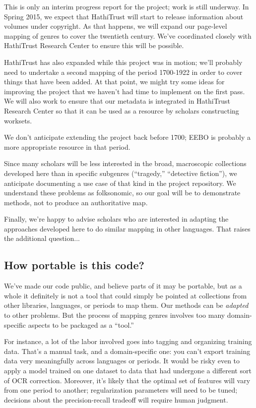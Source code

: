 \documentclass[paper=a4, fontsize=12pt]{scrartcl}
\numberwithin{equation}{section}		%
\numberwithin{figure}{section}			%
\numberwithin{table}{section}				%
\begin{document}
This is only an interim progress report for the project; work is still underway. In Spring 2015, we expect that HathiTrust will start to release information about volumes under copyright. As that happens, we will expand our page-level mapping of genres to cover the twentieth century. We've coordinated closely with HathiTrust Research Center to ensure this will be possible.

HathiTrust has also expanded while this project was in motion; we'll probably need to undertake a second mapping of the period 1700-1922 in order to cover things that have been added. At that point, we might try some ideas for improving the project that we haven't had time to implement on the first pass. We will also work to ensure that our metadata is integrated in HathiTrust Research Center so that it can be used as a resource by scholars constructing worksets.

We don't anticipate extending the project back before 1700; EEBO is probably a more appropriate resource in that period.

Since many scholars will be less interested in the broad, macroscopic collections developed here than in specific subgenres (``tragedy,'' ``detective fiction''), we anticipate documenting a use case of that kind in the project repository. We understand these problems as folksonomic, so our goal will be to demonstrate methods, not to produce an authoritative map.

Finally, we're happy to advise scholars who are interested in adapting the approaches developed here to do similar mapping in other languages. That raises the additional question...

\subsection{How portable is this code?}

We've made our code public, and believe parts of it may be portable, but as a whole it definitely is not a tool that could simply be pointed at collections from other libraries, languages, or periods to map them. Our methods can be \textit{adapted} to other problems. But the process of mapping genres involves too many domain-specific aspects to be packaged as a ``tool.''

For instance, a lot of the labor involved goes into tagging and organizing training data. That's a manual task, and a domain-specific one: you can't export training data very meaningfully across languages or periods. It would be risky even to apply a model trained on one dataset to data that had undergone a different sort of OCR correction. Moreover, it's likely that the optimal set of features will vary from one period to another; regularization parameters will need to be tuned; decisions about the precision-recall tradeoff will require human judgment.
\end{document}
